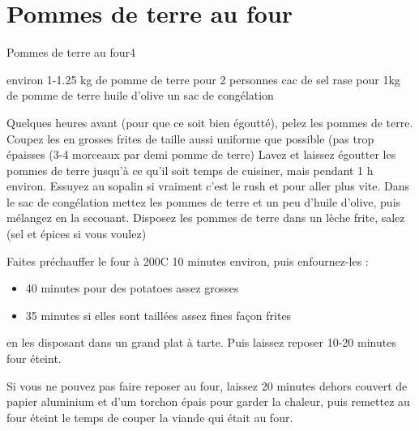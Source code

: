 {\section{Pommes de terre au four}
\begin{recette}{Pommes de terre au four}{4}{}{}\label{sec:pomme-de-terre-four}
\begin{ingredients}
\ingredient environ 1-1.25 kg de pomme de terre pour 2 personnes
 cac de sel rase pour 1kg de pomme de terre 
\ingredient huile d'olive
\ingredient un sac de congélation
\end{ingredients}

\begin{preparation}
\etape Quelques heures avant (pour que ce soit bien égoutté), pelez les pommes de terre. Coupez les en grosses frites de taille aussi uniforme que possible (pas trop épaisses (3-4 morceaux par demi pomme de terre)
\etape Lavez et laissez égoutter les pommes de terre jusqu'à ce qu'il soit temps de cuisiner, mais pendant 1 h environ. Essuyez au sopalin si vraiment c'est le rush et pour aller plus vite.
\etape Dans le sac de congélation mettez les pommes de terre et un peu d'huile d'olive, puis mélangez en la secouant.
\etape Disposez les pommes de terre dans un lèche frite, salez (sel et épices si vous voulez)
\end{preparation}

\begin{cuisson}
Faites préchauffer le four à 200\degres C 10 minutes environ, puis enfournez-les :
\begin{itemize}
\item 40 minutes pour des potatoes assez grosses
\item 35 minutes si elles sont taillées assez fines façon frites
\end{itemize}
en les disposant dans un grand plat à tarte. Puis laissez reposer 10-20 minutes four éteint. 
\begin{remarque}
Si vous ne pouvez pas faire reposer au four, laissez 20 minutes dehors couvert de papier aluminium et d'um torchon épais pour garder la chaleur, puis remettez au four éteint le temps de couper la viande qui était au four.
\end{remarque}





\end{cuisson}
\end{recette}}
